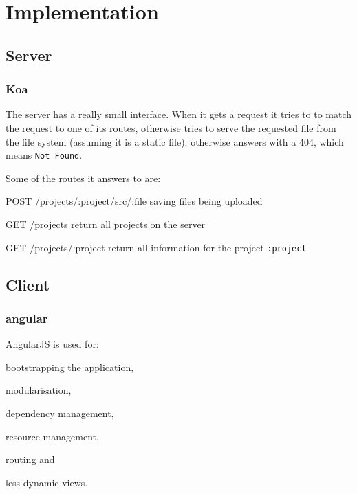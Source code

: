 
\section{Implementation}
\label{implementation}

\subsection{Server}
\label{used-tech}

\subsubsection{Koa}
\label{koa}

The server has a really small interface.
When it gets a request it tries to to match the request to one of its routes, otherwise tries to serve the requested file from the file system (assuming it is a static file), otherwise answers with a 404, which means \texttt{Not Found}.

Some of the routes it answers to are:
\begin{description*}
  \item[POST /projects/:project/src/:file]
    saving files being uploaded
  \item[GET /projects]
    return all projects on the server
  \item[GET /projects/:project]
    return all information for the project \texttt{:project}
\end{description*}

\subsection{Client}
\label{used-tech}

\subsubsection{angular}
\label{angular}

AngularJS is used for:

\begin{itemize*}
  \item bootstrapping the application,
  \item modularisation,
  \item dependency management,
  \item resource management,
  \item routing and
  \item less dynamic views.
\end{itemize*}


